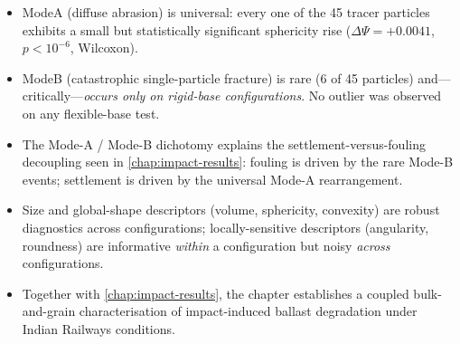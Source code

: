 \begin{chaptertakeaways}
\begin{itemize}[leftmargin=*,itemsep=2pt,topsep=2pt]
    \item \gls{ModeA} (diffuse abrasion) is universal: every one of
          the 45 tracer particles exhibits a small but statistically
          significant sphericity rise
          ($\Delta\Psi = +0.0041$, $p<10^{-6}$, Wilcoxon).
    \item \gls{ModeB} (catastrophic single-particle fracture) is rare
          (6 of 45 particles) and---critically---\emph{occurs only on
          rigid-base configurations}. No outlier was observed on any
          flexible-base test.
    \item The Mode-A / Mode-B dichotomy explains the
          settlement-versus-fouling decoupling seen in
          \cref{chap:impact-results}: fouling is driven by the rare
          Mode-B events; settlement is driven by the universal Mode-A
          rearrangement.
    \item Size and global-shape descriptors (volume, sphericity,
          convexity) are robust diagnostics across configurations;
          locally-sensitive descriptors (angularity, roundness) are
          informative \emph{within} a configuration but noisy
          \emph{across} configurations.
    \item Together with \cref{chap:impact-results}, the chapter
          establishes a coupled bulk-and-grain characterisation of
          impact-induced ballast degradation under Indian Railways
          conditions.
\end{itemize}
\end{chaptertakeaways}

